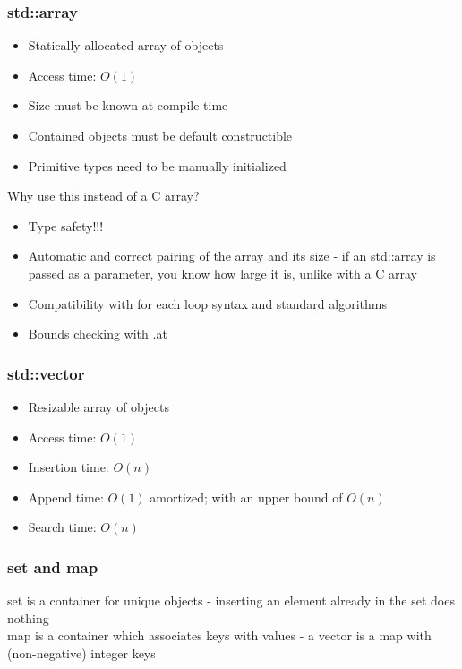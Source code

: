 \documentclass{beamer}
\begin{document}
\begin{frame}
  \frametitle{std::array}
  \begin{itemize}
  \item Statically allocated array of objects
  \item Access time: $O(1)$
  \item Size must be known at compile time
  \item Contained objects must be default constructible
  \item Primitive types need to be manually initialized
  \end{itemize}
  Why use this instead of a C array?
  \begin{itemize}
  \item Type safety!!!
  \item Automatic and correct pairing of the array and its size
    - if an std::array is passed as a parameter, you know how large it is, unlike with a C array
  \item Compatibility with for each loop syntax and standard algorithms
  \item Bounds checking with .at
  \end{itemize}
\end{frame}

\begin{frame}
  \frametitle{std::vector}
  \begin{itemize}
  \item Resizable array of objects
  \item Access time: $O(1)$
  \item Insertion time: $O(n)$
  \item Append time: $O(1)$ amortized; with an upper bound of $O(n)$
  \item Search time: $O(n)$
  \end{itemize}
\end{frame}

\begin{frame}[fragile]
  \frametitle{set and map}
  set is a container for unique objects - inserting an element already in the set does nothing\\
  map is a container which associates keys with values - a vector is a map with (non-negative) integer keys
\end{frame}
\end{document}
